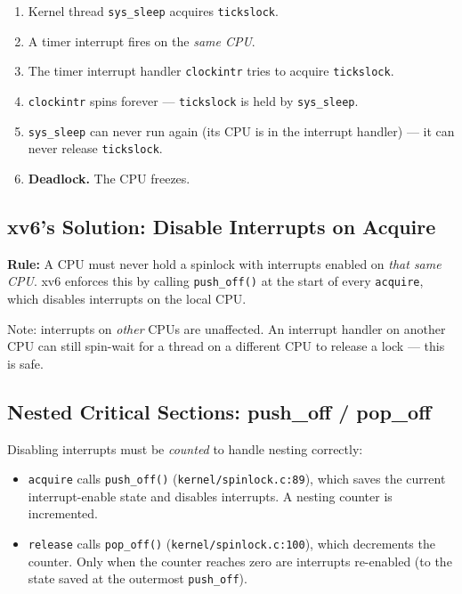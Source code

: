 \documentclass[11pt, a4paper]{article}
\begin{document}
\begin{tcolorbox}[race, title={The Interrupt Deadlock Scenario}]
\begin{enumerate}[leftmargin=1.8em, itemsep=0.2em]
  \item Kernel thread \lstinline|sys_sleep| acquires \lstinline|tickslock|.
  \item A timer interrupt fires on the \emph{same CPU}.
  \item The timer interrupt handler \lstinline|clockintr| tries to acquire \lstinline|tickslock|.
  \item \lstinline|clockintr| spins forever --- \lstinline|tickslock| is held by \lstinline|sys_sleep|.
  \item \lstinline|sys_sleep| can never run again (its CPU is in the interrupt handler) --- it can never release \lstinline|tickslock|.
  \item \textbf{Deadlock.} The CPU freezes.
\end{enumerate}
\end{tcolorbox}

\subsection{xv6's Solution: Disable Interrupts on Acquire}

\begin{tcolorbox}[foundational]
\textbf{Rule:} A CPU must never hold a spinlock with interrupts enabled on \emph{that same CPU}. xv6 enforces this by calling \lstinline|push_off()| at the start of every \lstinline|acquire|, which disables interrupts on the local CPU.

Note: interrupts on \emph{other} CPUs are unaffected. An interrupt handler on another CPU can still spin-wait for a thread on a different CPU to release a lock --- this is safe.
\end{tcolorbox}

\subsection{Nested Critical Sections: push\_off / pop\_off}

Disabling interrupts must be \emph{counted} to handle nesting correctly:

\begin{itemize}[leftmargin=1.5em]
  \item \lstinline|acquire| calls \lstinline|push_off()| (\lstinline|kernel/spinlock.c:89|), which saves the current interrupt-enable state and disables interrupts. A nesting counter is incremented.
  \item \lstinline|release| calls \lstinline|pop_off()| (\lstinline|kernel/spinlock.c:100|), which decrements the counter. Only when the counter reaches zero are interrupts re-enabled (to the state saved at the outermost \lstinline|push_off|).
\end{itemize}
\end{document}

